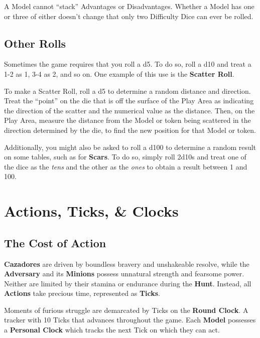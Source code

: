 \documentclass[
]{book}
\begin{document}
A Model cannot ``stack'' Advantages or Disadvantages. Whether a Model has one or three of either doesn't change that only two Difficulty Dice can ever be rolled.

\hypertarget{scatter}{%
\subsection*{Other Rolls}\label{scatter}}

Sometimes the game requires that you roll a d5. To do so, roll a d10 and treat a 1-2 as 1, 3-4 as 2, and so on. One example of this use is the \textbf{Scatter Roll}.

To make a Scatter Roll, roll a d5 to determine a random distance and direction. Treat the ``point'' on the die that is off the surface of the Play Area as indicating the direction of the scatter and the numerical value as the distance. Then, on the Play Area, measure the distance from the Model or token being scattered in the direction determined by the die, to find the new position for that Model or token.

Additionally, you might also be asked to roll a d100 to determine a random result on some tables, such as for \textbf{Scars}. To do so, simply roll 2d10s and treat one of the dice as the \emph{tens} and the other as the \emph{ones} to obtain a result between 1 and 100.

\hypertarget{actions-ticks-clocks}{%
\section{Actions, Ticks, \& Clocks}\label{actions-ticks-clocks}}

\hypertarget{ticks}{%
\subsection*{The Cost of Action}\label{ticks}}

\textbf{Cazadores} are driven by boundless bravery and unshakeable resolve, while the \textbf{Adversary} and its \textbf{Minions} possess unnatural strength and fearsome power. Neither are limited by their stamina or endurance during the \textbf{Hunt}. Instead, all \textbf{Actions} take precious time, represented as \textbf{Ticks}.

Moments of furious struggle are demarcated by Ticks on the \textbf{Round Clock}. A tracker with 10 Ticks that advances throughout the game. Each \textbf{Model} possesses a \textbf{Personal Clock} which tracks the next Tick on which they can act.
\end{document}

